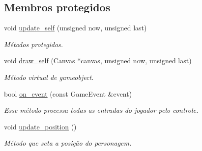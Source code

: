 \subsection*{Membros protegidos}
\begin{DoxyCompactItemize}
\item 
void \mbox{\hyperlink{classCharacterSelection_ae398845f5f793f40ddf8314a0ad16f7e}{update\+\_\+self}} (unsigned now, unsigned last)
\begin{DoxyCompactList}\small\item\em Métodos protegidos. \end{DoxyCompactList}\item 
\mbox{\label{classCharacterSelection_a474bb5f07bc3c530b4988a463ff83bb5}} 
void \mbox{\hyperlink{classCharacterSelection_a474bb5f07bc3c530b4988a463ff83bb5}{draw\+\_\+self}} (Canvas $\ast$canvas, unsigned now, unsigned last)
\begin{DoxyCompactList}\small\item\em Método virtual de gameobject. \end{DoxyCompactList}\item 
bool \mbox{\hyperlink{classCharacterSelection_af7d87f81c8bc895a89d9f13c09ed6b35}{on\+\_\+event}} (const Game\+Event \&event)
\begin{DoxyCompactList}\small\item\em Esse método processa todas as entradas do jogador pelo controle. \end{DoxyCompactList}\item 
\mbox{\label{classCharacterSelection_aa0a17d7b1a2092b9346c626d8c097253}} 
void \mbox{\hyperlink{classCharacterSelection_aa0a17d7b1a2092b9346c626d8c097253}{update\+\_\+position}} ()
\begin{DoxyCompactList}\small\item\em Método que seta a posição do personagem. \end{DoxyCompactList}\end{DoxyCompactItemize}
